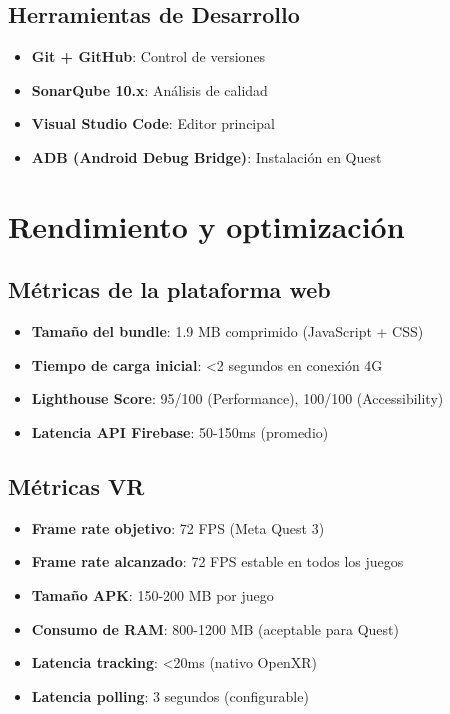 \subsection{Herramientas de Desarrollo}

\begin{itemize}
    \item \textbf{Git + GitHub}: Control de versiones
    \item \textbf{SonarQube 10.x}: Análisis de calidad
    \item \textbf{Visual Studio Code}: Editor principal
    \item \textbf{ADB (Android Debug Bridge)}: Instalación en Quest
\end{itemize}

\section{Rendimiento y optimización}

\subsection{Métricas de la plataforma web}

\begin{itemize}
    \item \textbf{Tamaño del bundle}: 1.9 MB comprimido (JavaScript + CSS)
    \item \textbf{Tiempo de carga inicial}: <2 segundos en conexión 4G
    \item \textbf{Lighthouse Score}: 95/100 (Performance), 100/100 (Accessibility)
    \item \textbf{Latencia API Firebase}: 50-150ms (promedio)
\end{itemize}

\subsection{Métricas VR}

\begin{itemize}
    \item \textbf{Frame rate objetivo}: 72 FPS (Meta Quest 3)
    \item \textbf{Frame rate alcanzado}: 72 FPS estable en todos los juegos
    \item \textbf{Tamaño APK}: 150-200 MB por juego
    \item \textbf{Consumo de RAM}: 800-1200 MB (aceptable para Quest)
    \item \textbf{Latencia tracking}: <20ms (nativo OpenXR)
    \item \textbf{Latencia polling}: 3 segundos (configurable)
\end{itemize}

